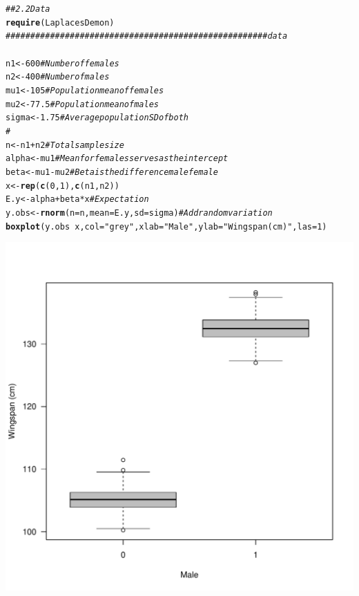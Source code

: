 \documentclass{article}\usepackage[]{graphicx}\usepackage[]{color}
\makeatletter
\def\maxwidth{ %
  \ifdim\Gin@nat@width>\linewidth
    \linewidth
  \else
    \Gin@nat@width
  \fi
}
\newcommand{\hlnum}[1]{\textcolor[rgb]{0.686,0.059,0.569}{#1}}%
\newcommand{\hlstr}[1]{\textcolor[rgb]{0.192,0.494,0.8}{#1}}%
\newcommand{\hlcom}[1]{\textcolor[rgb]{0.678,0.584,0.686}{\textit{#1}}}%
\newcommand{\hlopt}[1]{\textcolor[rgb]{0,0,0}{#1}}%
\newcommand{\hlstd}[1]{\textcolor[rgb]{0.345,0.345,0.345}{#1}}%
\newcommand{\hlkwb}[1]{\textcolor[rgb]{0.69,0.353,0.396}{#1}}%
\newcommand{\hlkwc}[1]{\textcolor[rgb]{0.333,0.667,0.333}{#1}}%
\newcommand{\hlkwd}[1]{\textcolor[rgb]{0.737,0.353,0.396}{\textbf{#1}}}%
\newenvironment{kframe}{%
 \def\at@end@of@kframe{}%
 \ifinner\ifhmode%
  \def\at@end@of@kframe{\end{minipage}}%
  \begin{minipage}{\columnwidth}%
 \fi\fi%
 \def\FrameCommand##1{\hskip\@totalleftmargin \hskip-\fboxsep
 \colorbox{shadecolor}{##1}\hskip-\fboxsep
     \hskip-\linewidth \hskip-\@totalleftmargin \hskip\columnwidth}%
 \MakeFramed {\advance\hsize-\width
   \@totalleftmargin\z@ \linewidth\hsize
   \@setminipage}}%
 {\par\unskip\endMakeFramed%
 \at@end@of@kframe}
\newenvironment{knitrout}{}{} %
\makeatother
\begin{document}
\begin{knitrout}
\color{fgcolor}\begin{kframe}
\begin{alltt}
\hlcom{## 2.2 Data ~~~~~~~~~~~~~~~~~~~}
\hlkwd{require}\hlstd{(LaplacesDemon)}
\hlcom{##################################################### data ~~~~~~~~~~~~~~~~~~}
\hlstd{n1} \hlkwb{<-} \hlnum{600}  \hlcom{# Number of females}
\hlstd{n2} \hlkwb{<-} \hlnum{400}  \hlcom{# Number of males}
\hlstd{mu1} \hlkwb{<-} \hlnum{105}  \hlcom{# Population mean of females}
\hlstd{mu2} \hlkwb{<-} \hlnum{77.5}  \hlcom{# Population mean of males}
\hlstd{sigma} \hlkwb{<-} \hlnum{1.75}  \hlcom{# Average population SD of both}
\hlcom{# }
\hlstd{n} \hlkwb{<-} \hlstd{n1} \hlopt{+} \hlstd{n2}  \hlcom{# Total sample size}
\hlstd{alpha} \hlkwb{<-} \hlstd{mu1}  \hlcom{# Mean for females serves as the intercept}
\hlstd{beta} \hlkwb{<-} \hlstd{mu1} \hlopt{-} \hlstd{mu2}  \hlcom{# Beta is the difference male female}
\hlstd{x} \hlkwb{<-} \hlkwd{rep}\hlstd{(}\hlkwd{c}\hlstd{(}\hlnum{0}\hlstd{,} \hlnum{1}\hlstd{),} \hlkwd{c}\hlstd{(n1, n2))}
\hlstd{E.y} \hlkwb{<-} \hlstd{alpha} \hlopt{+} \hlstd{beta} \hlopt{*} \hlstd{x}  \hlcom{# Expectation}
\hlstd{y.obs} \hlkwb{<-} \hlkwd{rnorm}\hlstd{(}\hlkwc{n} \hlstd{= n,} \hlkwc{mean} \hlstd{= E.y,} \hlkwc{sd} \hlstd{= sigma)}  \hlcom{# Add random variation}
\hlkwd{boxplot}\hlstd{(y.obs} \hlopt{~} \hlstd{x,} \hlkwc{col} \hlstd{=} \hlstr{"grey"}\hlstd{,} \hlkwc{xlab} \hlstd{=} \hlstr{"Male"}\hlstd{,} \hlkwc{ylab} \hlstd{=} \hlstr{"Wingspan (cm)"}\hlstd{,} \hlkwc{las} \hlstd{=} \hlnum{1}\hlstd{)}
\end{alltt}
\end{kframe}
\includegraphics[width=\maxwidth]{figure/unnamed-chunk-131} 

\end{knitrout}
\end{document}
